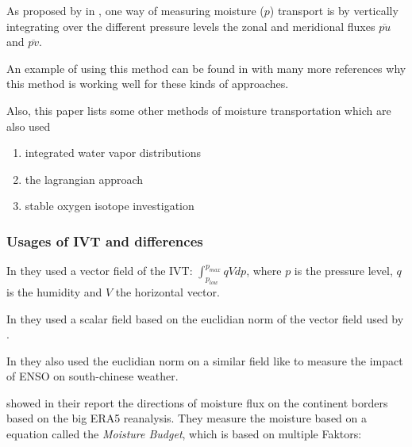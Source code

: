 As proposed by \citeauthor{zhu_proposed_1998} in \cite{zhu_proposed_1998}, one way of measuring moisture ($p$) transport is by vertically integrating over the different pressure levels the zonal and meridional fluxes $\overline{pu}$ and $\overline{pv}$. 

An example of using this method can be found in \cite{ayantobo_integrated_2022} with many more references why this method is working well for these kinds of approaches. 

Also, this paper lists some other methods of moisture transportation which are also used

\begin{enumerate}
  \item integrated water vapor distributions
  \item the lagrangian approach
  \item stable oxygen isotope investigation
\end{enumerate}

\subsubsection{Usages of IVT and differences}

In \cite{ralph_dropsonde_2017} they used a vector field of the IVT: $\int_{p_{low}}^{p_{max}} qV dp$, where $p$ is the pressure level, $q$ is the humidity and $V$ the horizontal vector.

In \cite{sousa_north_2020} they used a scalar field based on the euclidian norm of the vector field used by \cite{ralph_dropsonde_2017}.


In \cite{ayantobo_integrated_2022} they also used the euclidian norm on a similar field like \cite{ralph_dropsonde_2017} to measure the impact of  ENSO on south-chinese weather.


\citeauthor{yang_moisture_2022} showed in their report \cite{yang_moisture_2022} the directions of moisture flux on the continent borders based on the big ERA5 reanalysis.
They measure the moisture based on a equation called the \textit{Moisture Budget}, which is based on multiple Faktors: 



